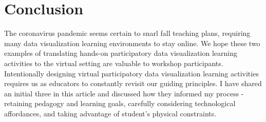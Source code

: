 \documentclass[journal]{vgtc}                %
\begin{document}
\section{Conclusion}
The coronavirus pandemic seems certain to snarl fall teaching plans, requiring many data visualization learning environments to stay online. We hope these two examples of translating hands-on participatory data visualization learning activities to the virtual setting are valuable to workshop participants. Intentionally designing virtual participatory data visualization learning activities requires us as educators to constantly revisit our guiding principles. I have shared an initial three in this article and discussed how they informed my process - retaining pedagogy and learning goals, carefully considering technological affordances, and taking advantage of student's physical constraints.


%

%
%
%


\end{document}
